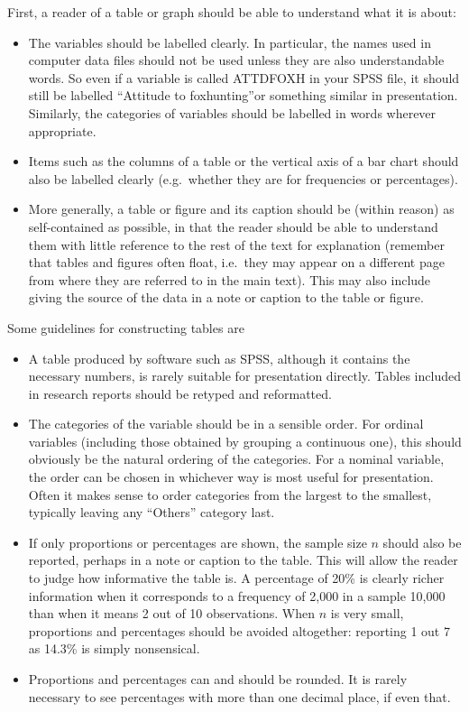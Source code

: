 First, a reader of a table or graph should be able to understand what
it is about:
\begin{itemize}
\item
The variables should be labelled clearly. In
particular, the names used in computer data files
should not
be used unless they are also understandable words. So even if a variable is called ATTDFOXH
in your SPSS file, it should still be labelled ``Attitude to
foxhunting''or something similar in presentation. Similarly, the
categories of variables should be labelled in words wherever
appropriate.
\item
Items such as the columns of a table or the vertical axis
of a bar chart should also be labelled clearly (e.g.\ whether they are for
frequencies or percentages).
\item
More generally, a table or figure and its caption should be (within
reason) as self-contained as possible, in that the reader should be able
to understand them with little reference to the rest of the text for
explanation (remember that tables and figures often float, i.e.\ they
may appear on a different page from where they are referred to in the
main text). This may also include giving the source of the data in a
note or caption to the table or figure.
\end{itemize}

Some guidelines for constructing tables are
\begin{itemize}
\item
A table produced by software such as SPSS, although it contains the
necessary numbers, is rarely suitable for presentation directly.
Tables included in research reports should be retyped and reformatted.
\item
The categories of the variable should be in a sensible order. For
ordinal variables (including those obtained by grouping a continuous
one), this should obviously be the natural ordering of the categories.
For a nominal variable, the order can be chosen in whichever way is most
useful for presentation. Often it makes sense to order categories from
the largest to the smallest, typically leaving any ``Others'' category
last.
\item
If only proportions or percentages are shown, the sample size $n$ should
also be reported, perhaps in a note or caption to the table. This will
allow the reader to judge how informative the table is. A percentage of
20\% is clearly richer information when it corresponds to a frequency of
2,000 in a sample 10,000 than when it means 2 out of 10 observations.
When $n$ is very small, proportions and percentages should be avoided
altogether: reporting 1 out 7 as 14.3\% is simply nonsensical.
\item
Proportions and percentages can and should be rounded. It is rarely
necessary to see percentages with more than one decimal place, if even
that.
\end{itemize}

